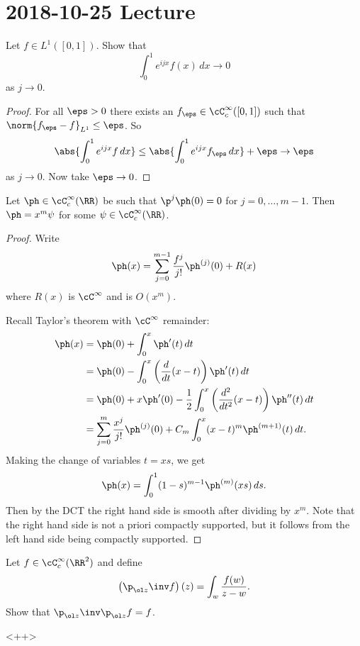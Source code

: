 \section{2018-10-25 Lecture}

\begin{exer}
  Let $f\in L^1([0,1])$.
  Show that
  \[ \int_0^1 e^{ijx}f(x)\,dx\to0 \]
  as $j\to0$.
\end{exer}

\begin{proof}
  For all $\eps>0$ there exists an $f_\eps\in\cC_c^\infty([0,1])$ such that $\norm{f_\eps-f}_{L^1}\leq\eps$.
  So
  \[ \abs{\int_0^1 e^{ijx}f\,dx} \leq \abs{\int_0^1e^{ijx}f_\eps\,dx}+\eps\to\eps \]
  as $j\to0$.
  Now take $\eps\to0$.
\end{proof}

\begin{exer}
  Let $\ph\in\cC_c^\infty(\RR)$ be such that $\p^j\ph(0)=0$ for $j=0,\ldots,m-1$.
  Then $\ph=x^m\psi$ for some $\psi\in\cC_c^\infty(\RR)$.
\end{exer}

\begin{proof}
  Write
  \[ \ph(x)=\sum_{j=0}^{m-1}\frac{f^j}{j!}\ph^{(j)}(0)+R(x) \]
  where $R(x)$ is $\cC^\infty$ and is $O(x^m)$.

  Recall Taylor's theorem with $\cC^\infty$ remainder:
  \begin{align*}
    \ph(x) &= \ph(0) + \int_0^x \ph'(t)\,dt \\
    &= \ph(0) - \int_0^x \left( \frac{d}{dt}(x-t) \right)\ph'(t)\,dt \\
    &= \ph(0) + x\ph'(0) - \frac12 \int_0^x \left( \frac{d^2}{dt^2}(x-t) \right)\ph''(t)\,dt \\
    &= \sum_{j=0}^m \frac{x^j}{j!} \ph^{(j)}(0) + C_m \int_0^x (x-t)^m \ph^{(m+1)}(t) \, dt. 
  \end{align*}
  Making the change of variables $t=xs$, we get
  \[ \ph(x) = \int_0^1 (1-s)^{m-1}\ph^{(m)}(xs) \, ds. \]
  Then by the DCT the right hand side is smooth after dividing by $x^m$.
  Note that the right hand side is not a priori compactly supported, but it follows from the left hand side being compactly supported.
\end{proof}

\begin{exer}
  Let $f\in\cC_c^\infty(\RR^2)$ and define
  \[ \left(\p_{\ol z}\inv f\right)(z) = \int_w \frac{f(w)}{z-w}. \]
  Show that $\p_{\ol z}\inv\p_{\ol z}f=f$.
\end{exer}<++>

